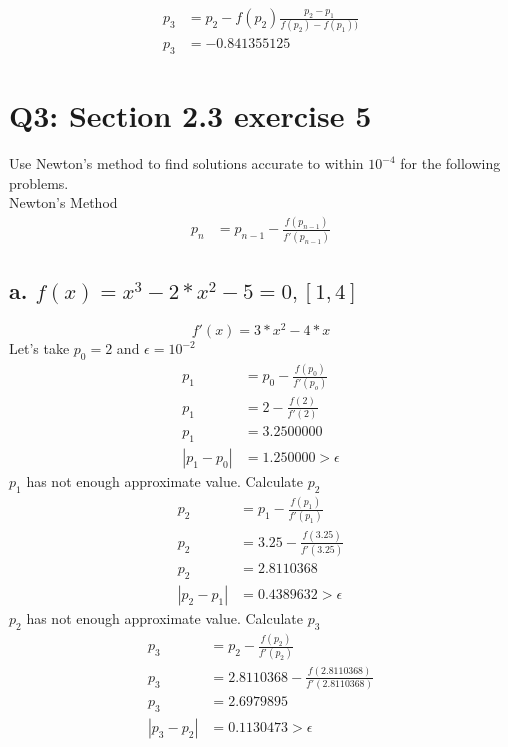 \documentclass{article}
\begin{document}
\begin{align}
\label{2.3.b.6}p_3 & = p_2 - f(p_2)\frac{p_2-p_1}{f(p_2)-f(p_1))}\\
\label{2.3.b.7}p_3 & = -0.841355125
\end{align}


\section{Q3: Section 2.3 exercise 5}
Use Newton’s method to find solutions accurate to within $10^{-4}$ for the following problems.\\
Newton's Method
\begin{align}
\label{newton_method} p_n & = p_{n-1} - \frac{f(p_{n-1})}{f'(p_{n-1})}
\end{align}
\subsection{a. $f(x)=x^3-2*x^2-5 = 0, [1, 4]$}
\begin{equation}
f'(x)=3*x^2-4*x
\end{equation}
Let's take $p_0=2$ and $\epsilon=10^{-2}$
\begin{align}
\label{2.3.5.a.1}p_1 & = p_0 - \frac{f(p_0)}{f'(p_o)}\\
\label{2.3.5.a.2}p_1 & = 2 - \frac{f(2)}{f'(2)}\\
\label{2.3.5.a.3}p_1 & = 3.2500000\\
\label{2.3.5.a.4}|p_1-p_0| & =1.250000 > \epsilon
\end{align}
$p_1$ has not enough approximate value. Calculate $p_2$
\begin{align}
\label{2.3.5.a.5}p_2 & = p_1 - \frac{f(p_1)}{f'(p_1)}\\
\label{2.3.5.a.6}p_2 & = 3.25 - \frac{f(3.25)}{f'(3.25)}\\
\label{2.3.5.a.7}p_2 & = 2.8110368\\
\label{2.3.5.a.8}|p_2-p_1| & =0.4389632 > \epsilon
\end{align}
$p_2$ has not enough approximate value. Calculate $p_3$
\begin{align}
\label{2.3.5.a.9}p_3 & = p_2 - \frac{f(p_2)}{f'(p_2)}\\
\label{2.3.5.a.10}p_3 & = 2.8110368 - \frac{f(2.8110368)}{f'(2.8110368)}\\
\label{2.3.5.a.11}p_3 & = 2.6979895\\
\label{2.3.5.a.12}|p_3-p_2| & =0.1130473 > \epsilon
\end{align}
\end{document}
